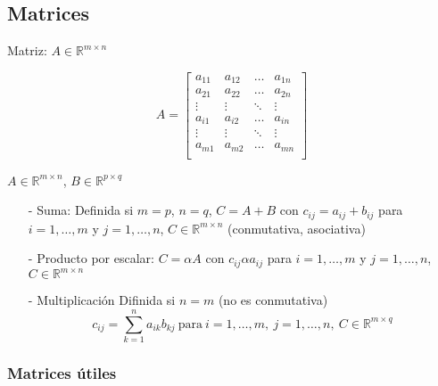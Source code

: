 \subsection{Matrices}\label{subsec:matrices}

Matriz: $A \in \mathbb{R}^{m \times n}$

\[
A = 
\begin{bmatrix}
a_{11} & a_{12} & \ldots & a_{1n} \\
a_{21} & a_{22} & \ldots & a_{2n} \\
\vdots & \vdots & \ddots & \vdots \\
a_{i1} & a_{i2} & \ldots & a_{in} \\
\vdots & \vdots & \ddots & \vdots \\
a_{m1} & a_{m2} & \ldots & a_{mn} \\
\end{bmatrix}
\]

\noindent $A \in \mathbb{R}^{m \times n}$, $B \in \mathbb{R}^{p \times q}$

\begin{itemize}
    \item[-] Suma: Definida si $m = p$, $n= q$, $C = A + B$ con $c_{ij} = a_{ij} + b_{ij}$ para $i= 1,\ldots, m$ y $j = 1,\ldots,n$, $C \in \mathbb{R}^{m \times n}$ (conmutativa, asociativa)
    \item[-] Producto por escalar:
    $C = \alpha A$ con $c_{ij} \alpha a_{ij}$ para $i= 1,\ldots, m$ y $j = 1,\ldots,n$, $C\in \mathbb{R}^{m \times n}$
    \item[-] Multiplicación Difinida si $n = m$ (no es conmutativa)
    \[c_{ij} = \sum_{k = 1}^{n} a_{ik}b_{kj} ~\text{para}~ i= 1,\ldots, m, ~j = 1,\ldots,n ,~ C \in \mathbb{R}^{m \times q}\]
\end{itemize}

\subsubsection{Matrices útiles}\label{subsubsec:matrices_utiles}

